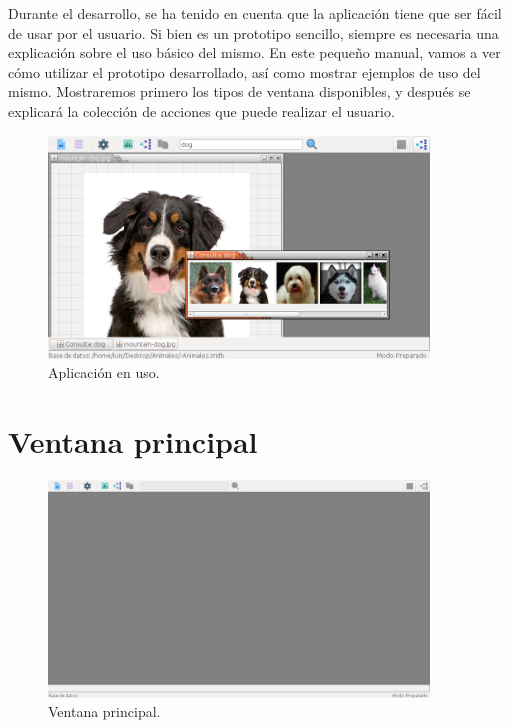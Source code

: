Durante el desarrollo, se ha tenido en cuenta que la aplicación tiene que ser fácil de usar por el usuario. Si bien es un prototipo sencillo, siempre es necesaria una explicación sobre el uso básico del mismo. En este pequeño manual, vamos a ver cómo utilizar el prototipo desarrollado, así como mostrar ejemplos de uso del mismo.  Mostraremos primero los tipos de ventana disponibles, y después se explicará la colección de acciones que puede realizar el usuario.\\

\begin{figure}[H]
\begin{center}

\includegraphics[width=0.9\textwidth]{img/v-uso.png}
\end{center}

\caption{Aplicación en uso.}
\end{figure}

\newpage
\section{Ventana principal}

\begin{figure}[H]
\begin{center}

\includegraphics[width=0.9\textwidth]{img/v-principal.png}
\end{center}

\caption{Ventana principal.}
\end{figure}

